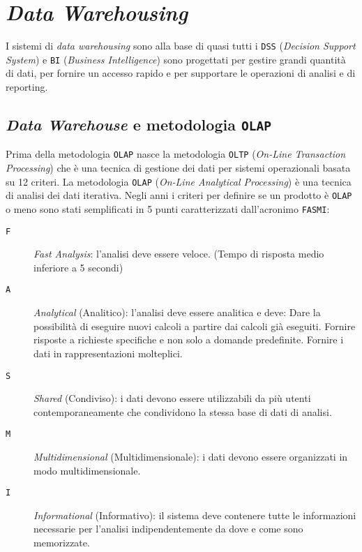 \chapter{\textit{Data Warehousing}}
\thispagestyle{chapterInit}

I sistemi di \textit{data warehousing} sono alla base di quasi tutti i \texttt{DSS} (\textit{Decision Support System}) e \texttt{BI} (\textit{Business Intelligence}) sono progettati per gestire grandi quantità di dati, per fornire un accesso rapido e per supportare le operazioni di analisi e di reporting.

\section{\textit{Data Warehouse} e metodologia \texttt{OLAP}}
    Prima della metodologia \texttt{OLAP} nasce la metodologia \texttt{OLTP} (\textit{On-Line Transaction Processing}) che è una tecnica di gestione dei dati per sistemi operazionali basata su 12 criteri.
    La metodologia \texttt{OLAP} (\textit{On-Line Analytical Processing}) è una tecnica di analisi dei dati iterativa.
    Negli anni i criteri per definire se un prodotto è \texttt{OLAP} o meno sono stati semplificati in 5 punti caratterizzati dall'acronimo \texttt{FASMI}:
    \begin{description}
        \item[\texttt{F}] \textit{Fast Analysis}: l'analisi deve essere veloce. (Tempo di risposta medio inferiore a 5 secondi)
        \item[\texttt{A}] \textit{Analytical} (Analitico): l'analisi deve essere analitica e deve:
            \subitem Dare la possibilità di eseguire nuovi calcoli a partire dai calcoli già eseguiti.
            \subitem Fornire risposte a richieste specifiche e non solo a domande predefinite.
            \subitem Fornire i dati in rappresentazioni molteplici.
        \item[\texttt{S}] \textit{Shared} (Condiviso): i dati devono essere utilizzabili da più utenti contemporaneamente che condividono la stessa base di dati di analisi.
        \item[\texttt{M}] \textit{Multidimensional} (Multidimensionale): i dati devono essere organizzati in modo multidimensionale.
        \item[\texttt{I}] \textit{Informational} (Informativo): il sistema deve contenere tutte le informazioni necessarie per l'analisi indipendentemente da dove e come sono memorizzate.
    \end{description}

